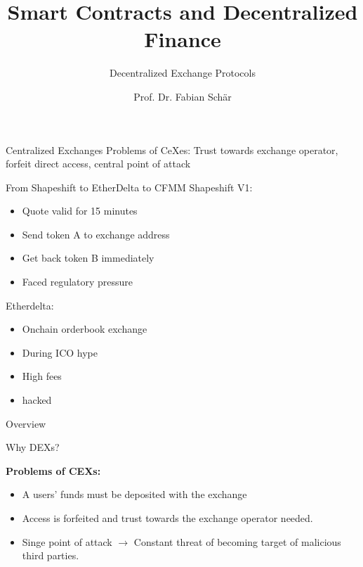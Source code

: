 \documentclass[]{beamer}
\title{Smart Contracts and Decentralized Finance}
\subtitle{Decentralized Exchange Protocols}
\author{Prof. Dr. Fabian Schär}
\institute{University of Basel}
\begin{document}
\thispagestyle{empty}
\begin{frame}[noframenumbering]
	\titlepage
\end{frame}

\begin{frame}{Centralized Exchanges}
	Problems of CeXes: Trust towards exchange operator, forfeit direct access, central point of attack
\end{frame}

\begin{frame}{From Shapeshift to EtherDelta to CFMM}
Shapeshift V1:
\begin{itemize}
	\item Quote valid for 15 minutes
	\item Send token A to exchange address
	\item Get back token B immediately
	\item Faced regulatory pressure
\end{itemize}

Etherdelta:
\begin{itemize}
	\item Onchain orderbook exchange
	\item During ICO hype
	\item High fees
	\item hacked
\end{itemize}
\end{frame}

\begin{frame}{Overview}
	\begin{figure}[h!]
		
	\end{figure}
\end{frame}	


\begin{frame}{Why DEXs?}

	\textbf{Problems of CEXs:}
		\begin{small}
		\begin{itemize}
			\item A users' funds must be deposited with the exchange
			\item Access is forfeited and trust towards the exchange operator needed.
			\item Singe point of attack $\rightarrow$ Constant threat of becoming target of malicious third parties.
		\end{itemize}
		\end{small}	

\vspace{1.5em}

\end{frame}
\end{document}
